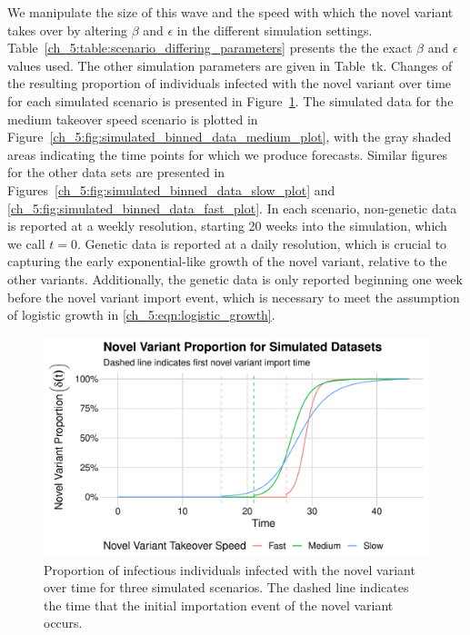 We manipulate the size of this wave and the speed with which the novel variant takes over by altering \( \beta \) and \( \epsilon \) in the different simulation settings.
Table~\ref{ch_5:table:scenario_differing_parameters} presents the  the exact \( \beta \) and \( \epsilon \) values used.
The other simulation parameters are given in Table~tk.
Changes of the resulting proportion of individuals infected with the novel variant over time for each simulated scenario is presented in Figure~\ref{ch_5:fig:proportion_novel_variant_simulated_data_plot}.
The simulated data for the medium takeover speed scenario is plotted in Figure~\ref{ch_5:fig:simulated_binned_data_medium_plot}, with the gray shaded areas indicating the time points for which we produce forecasts.
Similar figures for the other data sets are presented in Figures~\ref{ch_5:fig:simulated_binned_data_slow_plot} and \ref{ch_5:fig:simulated_binned_data_fast_plot}.
In each scenario, non-genetic data is reported at a weekly resolution, starting 20 weeks into the simulation, which we call \( t = 0 \).
Genetic data is reported at a daily resolution, which is crucial to capturing the early exponential-like growth of the novel variant, relative to the other variants.
Additionally, the genetic data is only reported beginning one week before the novel variant import event, which is necessary to meet the assumption of logistic growth in \eqref{ch_5:eqn:logistic_growth}.

\begin{figure}
    \centering
    \includegraphics[width=1.0\columnwidth]{proportion_novel_variant_simulated_data_plot}
    \caption{Proportion of infectious individuals infected with the novel variant over time for three simulated scenarios.
    The dashed line indicates the time that the initial importation event of the novel variant occurs.}
    \label{ch_5:fig:proportion_novel_variant_simulated_data_plot}
\end{figure}


